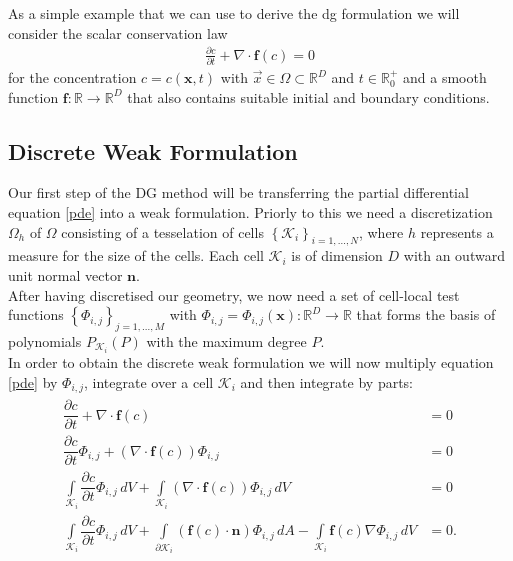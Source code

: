 		As a simple example that we can use to derive the \gls{dg} formulation we will consider the scalar conservation law 	
		\begin{align}
			\frac{\partial c}{\partial t} + \nabla \cdot \boldsymbol{f}(c) = 0
			\label{pde}
		\end{align}	
		for the concentration $c = c(\boldsymbol{x}, t)$  with $\vec{x} \in \Omega \subset \mathbb{R}^D$ and $t\in \mathbb{R}_0^+$ and a smooth function $\boldsymbol{f}:\mathbb{R} \rightarrow \mathbb{R}^D$ that also contains suitable initial and boundary conditions.\cite{mueller2014} 
		\subsection{Discrete Weak Formulation}
		Our first step of the DG method will be transferring the partial differential equation \eqref{pde} into a weak formulation.
		Priorly to this we need a discretization $\Omega_h$ of $\Omega$ consisting of a tesselation of cells $\left\{ \mathcal{K}_i \right\}_{i=1,...,N}$, where $h$ represents a measure for the size of the cells. Each cell $\mathcal{K}_i$ is of dimension $D$ with an outward unit normal vector $\boldsymbol{n}$. \\ \indent 
		After having discretised our geometry, we now need a set of cell-local test functions $\left\{\Phi_{i,j}\right\}_{j=1,...,M} $ with $\Phi_{i,j}=\Phi_{i,j}(\boldsymbol{x}):\mathbb{R}^D\rightarrow\mathbb{R}$ that forms the basis of polynomials $P_{\mathcal{K}_i}(P)$ with the maximum degree $P$. \\ \indent
		In order to obtain the discrete weak formulation we will now multiply equation \eqref{pde} by $\Phi_{i,j}$, integrate over a cell $\mathcal{K}_i$ and then integrate by parts:	
		\begin{gather}	
			\begin{aligned}
			\dfrac{\partial c}{\partial t} + \nabla \cdot \boldsymbol{f}(c) &= 0 \\ 
			\dfrac{\partial c}{\partial t}\Phi_{i,j} + \left(\nabla \cdot \boldsymbol{f}(c)\right)\Phi_{i,j} &= 0 \\ 
			\int\limits_{\mathcal{K}_i} \dfrac{\partial c}{\partial t}\Phi_{i,j} \, dV + \int\limits_{\mathcal{K}_i}\left(\nabla \cdot \boldsymbol{f}(c)\right)\Phi_{i,j} \, dV &= 0\\ 
			\int\limits_{\mathcal{K}_i} \dfrac{\partial c}{\partial t}\Phi_{i,j} \, dV +
			\int\limits_{\partial \mathcal{K}_i} \left(\boldsymbol{f} \left( c \right) \cdot \boldsymbol{n} \right)\Phi_{i,j} \, dA
			- \int\limits_{\mathcal{K}_i} \boldsymbol{f}\left(c\right)\nabla\Phi_{i,j} \, dV &= 0.
			\label{partialintegration}
			\end{aligned}
		\end{gather}
